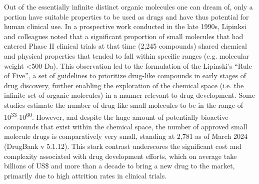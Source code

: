 Out of the essentially infinite distinct organic molecules one can dream of, only a portion have suitable properties to be used as drugs and have thus potential for human clinical use. In a prospective work conducted in the late 1990s, Lipinksi and colleagues noted that a significant proportion of small molecules that had entered Phase II clinical trials at that time (2,245 compounds) shared chemical and physical properties that tended to fall within specific ranges (e.g. molecular weight <500 Da)\cite{lipinski_experimental_2001}. This observation led to the formulation of the Lipinski's “Rule of Five”, a set of guidelines to prioritize drug-like compounds in early stages of drug discovery, further enabling the exploration of the chemical space (i.e. the infinite set of organic molecules) in a manner relevant to drug development\cite{lipinski_navigating_2004, dobson_chemical_2004, reymond_chemical_2010}. Some studies estimate the number of drug-like small molecules to be in the range of 10\textsuperscript{33}-10\textsuperscript{60}\cite{bohacek_art_1996, polishchuk_estimation_2013}. However, and despite the huge amount of potentially bioactive compounds that exist within the chemical space, the number of approved small molecule drugs is comparatively very small, standing at 2,781 as of March 2024 (DrugBank\cite{knox_2024} v 5.1.12). This stark contrast underscores the significant cost and complexity associated with drug development efforts, which on average take billions of US\$ and more than a decade to bring a new drug to the market\cite{wouters_estimated_2020, sertkaya_costs_2024, dimasi_innovation_2016, hinkson_accelerating_2020, dimasi_research_2020}, primarily due to high attrition rates in clinical trials\cite{sun_why_2022}. 

